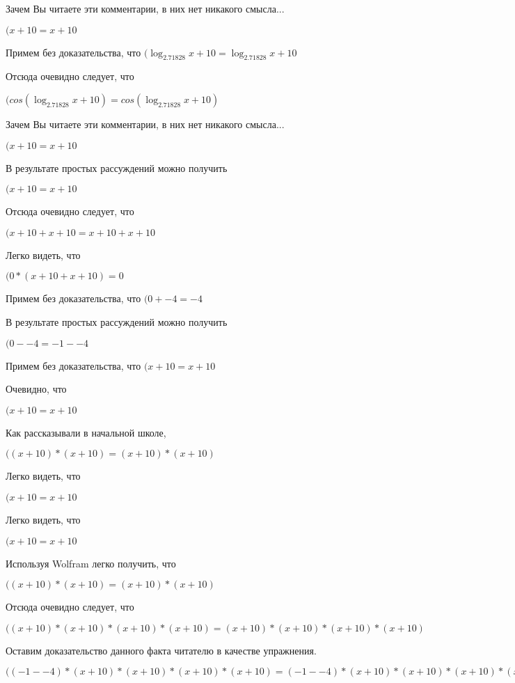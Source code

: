 \documentclass[12pt,a4paper,fleqn]{article}
\theoremstyle{definition}
\begin{document}
Зачем Вы читаете эти комментарии, в них нет никакого смысла...

$( x  +  10  =  x  +  10 $

Примем без доказательства, что
$(\log_{ 2.71828 }{ x  +  10 } = \log_{ 2.71828 }{ x  +  10 }$

Отсюда очевидно следует, что

$(cos(\log_{ 2.71828 }{ x  +  10 }) = cos(\log_{ 2.71828 }{ x  +  10 })$

Зачем Вы читаете эти комментарии, в них нет никакого смысла...

$( x  +  10  =  x  +  10 $

В результате простых рассуждений можно получить

$( x  +  10  =  x  +  10 $

Отсюда очевидно следует, что

$( x  +  10  +  x  +  10  =  x  +  10  +  x  +  10 $

Легко видеть, что

$( 0  * ( x  +  10  +  x  +  10 ) =  0 $

Примем без доказательства, что
$( 0  +  -4  =  -4 $

В результате простых рассуждений можно получить

$( 0  -  -4  =  -1  -  -4 $

Примем без доказательства, что
$( x  +  10  =  x  +  10 $

Очевидно, что

$( x  +  10  =  x  +  10 $

Как рассказывали в начальной школе,

$(( x  +  10 ) * ( x  +  10 ) = ( x  +  10 ) * ( x  +  10 )$

Легко видеть, что

$( x  +  10  =  x  +  10 $

Легко видеть, что

$( x  +  10  =  x  +  10 $

Используя Wolfram легко получить, что

$(( x  +  10 ) * ( x  +  10 ) = ( x  +  10 ) * ( x  +  10 )$

Отсюда очевидно следует, что

$(( x  +  10 ) * ( x  +  10 ) * ( x  +  10 ) * ( x  +  10 ) = ( x  +  10 ) * ( x  +  10 ) * ( x  +  10 ) * ( x  +  10 )$

Оставим доказательство данного факта читателю в качестве упражнения.

$(( -1  -  -4 ) * ( x  +  10 ) * ( x  +  10 ) * ( x  +  10 ) * ( x  +  10 ) = ( -1  -  -4 ) * ( x  +  10 ) * ( x  +  10 ) * ( x  +  10 ) * ( x  +  10 )$
\end{document}
